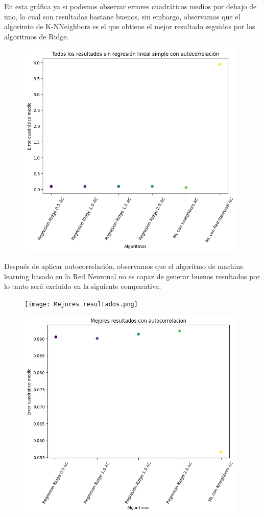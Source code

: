 \documentclass[oneside,openright,titlepage,numbers=noenddot,openany,headinclude,footinclude=true,
cleardoublepage=empty,abstractoff,BCOR=5mm,paper=a4,fontsize=12pt,main=spanish]{scrreprt}
\begin{document}
En esta gráfica ya si podemos observar errores cuadráticos medios por debajo de uno, lo cual son resultados bastane buenos, sin embargo, observamos que el algorimto de K-NNeighbors es el que obtiene el mejor resultado seguidos por los algoritmos de Ridge.

\begin{figure}[H]
	\centering
	\includegraphics[width=11cm]{Todos los resultados sin regresión lineal simple con autocorrelación.png}
\end{figure}

Después de aplicar autocorrelación, observamos que el algoritmo de machine learning basado en la Red Neuronal no es capaz de generar buenos resultados por lo tanto será excluido en la siguiente comparativa.

\begin{figure}[H]
	\centering
	\texttt{[image: Mejores resultados.png]}
\end{figure}

\begin{figure}[H]
	\centering
	\includegraphics[width=11cm]{Mejores resultados con autocorrelación.png}
\end{figure}
\end{document}
